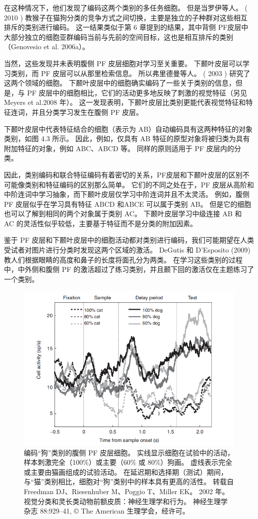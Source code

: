 在这种情况下，他们发现了编码这两个类别的多任务细胞。 
但是当罗伊等人。 ( 2010 ) 教猴子在猫狗分类的竞争方式之间切换，主要是独立的子种群对这些相互排斥的类别进行编码。 
这一结果类似于第 6 章提到的结果，其中背侧 PF皮层中大部分独立的细胞亚群编码当前与先前的空间目标，这也是相互排斥的类别（Genovesio et al. 2006a）。
\par
当然，这些发现并未表明腹侧 PF 皮层细胞对学习至关重要。 
下颞叶皮层可以学习类别，而 PF 皮层可以从那里检索信息。 
所以弗里德曼等人。 ( 2003 ) 研究了这两个领域的细胞。 
下颞叶皮层中的细胞确实编码了一些关于类别的信息，但是，与 PF 皮层中的细胞相比，它们的活动更多地反映了刺激的视觉特征（另见 Meyers et al.2008 年）。 
这一发现表明，下颞叶皮层比类别更能代表视觉特征和特征连词，并且分类学习发生在腹侧 PF 皮层。
\par
下颞叶皮层中代表特征结合的细胞（表示为 AB）自动编码具有这两种特征的对象类别，如图 4.3 所示。 
因此，例如，仅具有 AB 特征的原型对象将被归类为具有附加特征的对象，例如 ABC、ABCD 等。 
同样的原则适用于 PF 皮层内的分类。
\par
因此，类别编码和联合特征编码有着密切的关系，PF皮层和下颞叶皮层的区别不可能像类别和特征编码的区别那么简单。 
它们的不同之处在于，PF 皮层从高阶和中阶连词中学习抽象，而下颞叶皮层仅学习中阶连词并且不太灵活。
例如，腹侧 PF 皮层似乎在学习具有特征 ABCD 和ABCE 可以属于类别 AB。 
但是它的细胞也可以了解到相同的两个对象属于类别 AC。 
下颞叶皮层学习中级连接 AB 和 AC 的灵活性似乎较低，主要基于特征而不是分类的附加因素。
\par
鉴于 PF 皮层和下颞叶皮层中的细胞活动都对类别进行编码，我们可能期望在人类受试者对图片进行分类时发现这两个区域的激活。 
DeGutis 和 D’Esposito (2009) 教人们根据眼睛的高度和鼻子的长度将面孔分为两类。 
在学习这些类别的过程中，中外侧和腹侧 PF 的激活超过了练习类别，并且颞下回的激活仅在主题练习了一个类别。
\begin{figure}
	\centering
	\includegraphics[width=0.6\linewidth]{image_pfc/Fig_7_6}
	\caption{编码“狗”类别的腹侧 PF 皮层细胞。 实线显示细胞在试验中的活动，样本刺激完全（100\%）或主要（60\% 或 80\%）狗画。
		虚线表示完全或主要由猫画组成的试验活动。 
		在延迟期和选择期（测试）期间，与“猫”类别相比，细胞对“狗”类别中的样本具有更高的活性。 
		转载自 Freedman DJ、Riesenhuber M、Poggio T、Miller EK。 2002 年。 
		视觉分类和灵长类动物前额皮质：神经生理学和行为。 
		神经生理学杂志 88:929–41, © The American 生理学会，经许可。}
	\label{fig:fig}
\end{figure}
